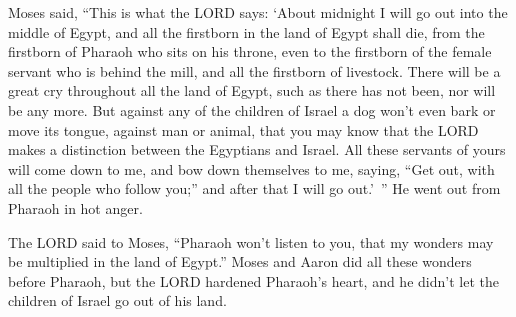 \myverse{}Moses said, “This is what the LORD says: ‘About midnight I will
go out into the middle of Egypt,
\myverse{}and all the firstborn in the land of Egypt shall die, from the firstborn of
Pharaoh who sits on his throne, even to the firstborn of the female servant who is behind the mill, and
all the firstborn of livestock.
\myverse{}There will be a great cry throughout all the land of Egypt, such as there has
not been, nor will be any more.
\myverse{}But against any of the children of Israel a dog won’t even bark or move its
tongue, against man or animal, that you may know that the LORD makes a distinction between the Egyptians
and Israel.
\myverse{}All these servants of yours will come down to me, and bow down themselves to
me, saying, “Get out, with all the people who follow you;” and after that I will go out.’ ” He went out
from Pharaoh in hot anger.


\myverse{}The LORD said to Moses, “Pharaoh won’t listen to you, that my
wonders may be multiplied in the land of Egypt.”
\myverse{}Moses and Aaron did all these wonders before Pharaoh, but the LORD hardened
Pharaoh’s heart, and he didn’t let the children of Israel go out of his land.


